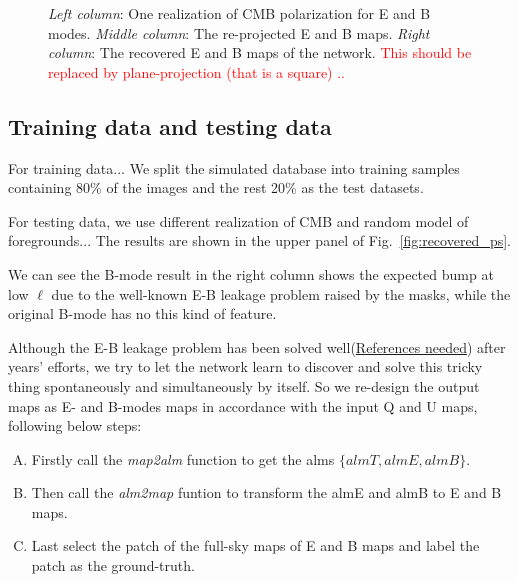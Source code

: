 \documentclass[floatfix]{emulateapj}
\begin{document}
\begin{figure}[htpb]
{{   }
}
\caption{{\it Left column}: One realization of CMB polarization for E and B modes. {\it Middle column}: The re-projected E and B maps. {\it Right column}: The recovered E and B maps of the network. \textcolor{red}{This should be replaced by plane-projection (that is a square) ..}}
\label{fig:recovered_maps}
\end{figure}

\subsection{Training data and testing data}
For training data...
We split the simulated database into training samples containing 80\% of the images and the rest 20\% as the test datasets.

For testing data, we use different realization of CMB and random model of foregrounds... The results are shown in the upper panel of Fig.~\ref{fig:recovered_ps}.
 
We can see the B-mode result in the right column shows the expected bump at low $\ell$ due to the well-known E-B leakage problem raised by the masks, while the original B-mode has no this kind of feature. 

Although the E-B leakage problem has been solved well(\underline{References needed}) after years' efforts, we try to let the network learn to discover and solve this tricky thing spontaneously and simultaneously by itself. So we re-design the output maps as E- and B-modes maps in accordance with the input Q and U maps, following below steps:
\begin{enumerate}[(A)]
\item Firstly call the \emph{map2alm} function to get the alms $\{almT, almE, almB\}$. 
\item Then call the \emph{alm2map} funtion to transform the almE and almB  to E and B maps.
\item Last select the patch of the full-sky maps of E and B maps and label the patch as the ground-truth.
\end{enumerate}
 
\end{document}
